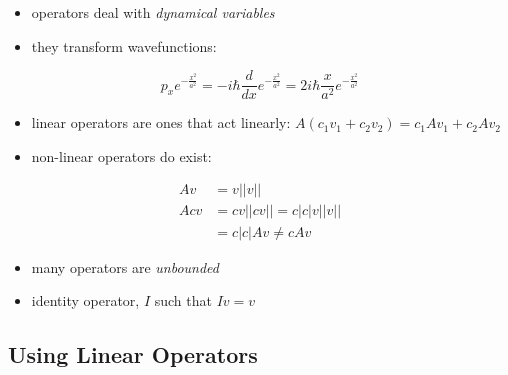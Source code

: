 \documentclass[a4paper,11pt,normalem]{article}
\begin{document}
\begin{itemize}
\item
  operators deal with \emph{dynamical variables}
\item
  they transform wavefunctions:
\end{itemize}

\[
    p_x e^{-\frac{x^2}{a^2}} = -i\hbar\frac{d}{dx}e^{-\frac{x^2}{a^2}} = 2i\hbar\frac{x}{a^2}e^{-\frac{x^2}{a^2}}
\]

\begin{itemize}
\item
  linear operators are ones that act linearly:
  \(A(c_1v_1 + c_2v_2) = c_1Av_1 + c_2Av_2\)
\item
  non-linear operators do exist:
\end{itemize}

\[
    \begin{aligned}
    Av &= v||v|| \\
    Acv &= cv||cv|| = c|c|v||v|| \\
    &= c|c|Av \neq cAv
    \end{aligned}
\]

\begin{itemize}
\item
  many operators are \emph{unbounded}
\item
  identity operator, \(I\) such that \(Iv = v\)
\end{itemize}

\subsection{Using Linear Operators}\label{using-linear-operators}
\end{document}
